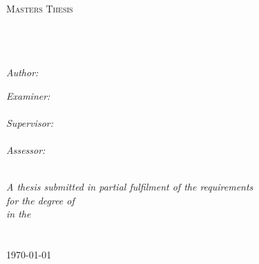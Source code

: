 \documentclass[11pt, oneside, dvipsnames]{Thesis} %
\begin{document}
\begingroup
\hypersetup{
	urlcolor=black
}
\begin{titlepage}
	\begin{center}

		\textsc{\LARGE \univname}\\[1.5cm] %
		\textsc{\Large Masters Thesis}\\[0.5cm] %

		\HRule \\[0.4cm] %
		{\huge \bfseries \ttitle}\\[0.4cm] %
		\HRule \\[1.5cm] %

		\begin{minipage}{0.4\textwidth}
			\begin{flushleft} \large
				\emph{Author:}\\
				\href{http://amirsahrani.com}{\authornames} %
			\end{flushleft}
		\end{minipage}
		\begin{minipage}{0.4\textwidth}
			\begin{flushright} \large
				\emph{Examiner:} \\
				{\exname}\\
				\emph{Supervisor:} \\
				{\supname}\\
				\emph{Assessor:} \\
				{\assessorname}
			\end{flushright}
		\end{minipage}\\[1cm]

		\large \textit{A thesis submitted in partial fulfilment of the requirements\\ for the degree of \degreename}\\[0.3cm] %
		\textit{in the}\\[0.4cm]
		\groupname\\\deptname\\[2cm] %

		{\large \today}\\[2cm] %

		\vfill
	\end{center}

\end{titlepage}
\endgroup
\end{document}
